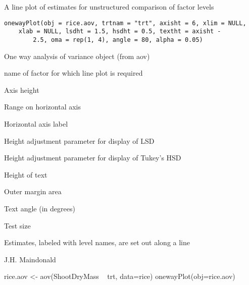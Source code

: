\begin{Description}\relax
A line plot of estimates for unstructured comparison of factor levels
\end{Description}
\begin{Usage}
\begin{verbatim}
onewayPlot(obj = rice.aov, trtnam = "trt", axisht = 6, xlim = NULL, 
    xlab = NULL, lsdht = 1.5, hsdht = 0.5, textht = axisht - 
        2.5, oma = rep(1, 4), angle = 80, alpha = 0.05)
\end{verbatim}
\end{Usage}
\begin{Arguments}
\begin{ldescription}
\item[\code{obj}] One way analysis of variance object (from aov)
\item[\code{trtnam}] name of factor for which line plot is required
\item[\code{axisht}] Axis height
\item[\code{xlim}] Range on horizontal axis
\item[\code{xlab}] Horizontal axis label
\item[\code{lsdht}] Height adjustment parameter for display of LSD
\item[\code{hsdht}] Height adjustment parameter for display of Tukey's HSD
\item[\code{textht}] Height of text
\item[\code{oma}] Outer margin area
\item[\code{angle}] Text angle (in degrees)
\item[\code{alpha}] Test size
\end{ldescription}
\end{Arguments}
\begin{Value}
Estimates, labeled with level names, are set out along a line
\end{Value}
\begin{Author}\relax
J.H. Maindonald
\end{Author}
\begin{Examples}
\begin{ExampleCode}
rice.aov <- aov(ShootDryMass ~ trt, data=rice)
onewayPlot(obj=rice.aov)
\end{ExampleCode}
\end{Examples}

